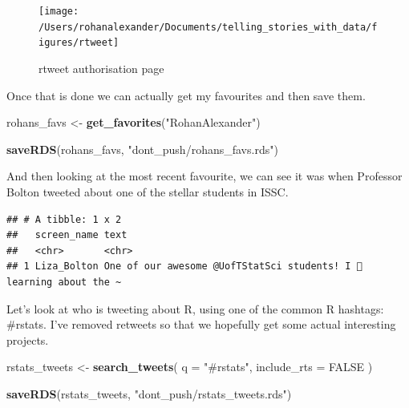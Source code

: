 \documentclass[
]{book}
\newenvironment{Shaded}{\begin{snugshade}}{\end{snugshade}}
\newcommand{\DataTypeTok}[1]{\textcolor[rgb]{0.13,0.29,0.53}{#1}}
\newcommand{\DecValTok}[1]{\textcolor[rgb]{0.00,0.00,0.81}{#1}}
\newcommand{\KeywordTok}[1]{\textcolor[rgb]{0.13,0.29,0.53}{\textbf{#1}}}
\newcommand{\NormalTok}[1]{#1}
\newcommand{\OperatorTok}[1]{\textcolor[rgb]{0.81,0.36,0.00}{\textbf{#1}}}
\newcommand{\OtherTok}[1]{\textcolor[rgb]{0.56,0.35,0.01}{#1}}
\newcommand{\StringTok}[1]{\textcolor[rgb]{0.31,0.60,0.02}{#1}}
\begin{document}
\begin{figure}
\texttt{[image: /Users/rohanalexander/Documents/telling\_stories\_with\_data/figures/rtweet]} \caption{rtweet authorisation page}\label{fig:rtweetlogin}
\end{figure}

Once that is done we can actually get my favourites and then save them.

\begin{Shaded}
\begin{Highlighting}[]
\NormalTok{rohans_favs <-}\StringTok{ }\KeywordTok{get_favorites}\NormalTok{(}\StringTok{"RohanAlexander"}\NormalTok{)}

\KeywordTok{saveRDS}\NormalTok{(rohans_favs, }\StringTok{"dont_push/rohans_favs.rds"}\NormalTok{)}
\end{Highlighting}
\end{Shaded}

And then looking at the most recent favourite, we can see it was when Professor Bolton tweeted about one of the stellar students in ISSC.

\begin{Shaded}
\end{Shaded}

\begin{verbatim}
## # A tibble: 1 x 2
##   screen_name text                                                              
##   <chr>       <chr>                                                             
## 1 Liza_Bolton One of our awesome @UofTStatSci students! I 💜 learning about the ~
\end{verbatim}

Let's look at who is tweeting about R, using one of the common R hashtags: \#rstats. I've removed retweets so that we hopefully get some actual interesting projects.

\begin{Shaded}
\begin{Highlighting}[]
\NormalTok{rstats_tweets <-}\StringTok{ }\KeywordTok{search_tweets}\NormalTok{(}
  \DataTypeTok{q =} \StringTok{"#rstats"}\NormalTok{,}
  \DataTypeTok{include_rts =} \OtherTok{FALSE}
\NormalTok{)}

\KeywordTok{saveRDS}\NormalTok{(rstats_tweets, }\StringTok{"dont_push/rstats_tweets.rds"}\NormalTok{)}
\end{Highlighting}
\end{Shaded}
\end{document}
